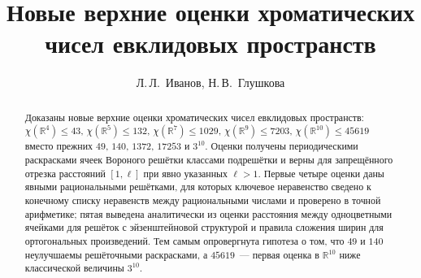 \documentclass{article}
\theoremstyle{plain}
\theoremstyle{remark}
\newcommand{\R}{\mathbb{R}}
\begin{document}


\title{Новые верхние оценки хроматических чисел евклидовых пространств}

\author{Л.\,Л.~Иванов\Addressmark[1]\Emailmark[1],
Н.\,В.~Глушкова\Addressmark[2]\Emailmark[2]}





\dateA{\ldots}





\maketitle

\begin{abstract}
Доказаны новые верхние оценки хроматических чисел евклидовых пространств:
$\chi(\R^4)\le43$, $\chi(\R^5)\le132$, $\chi(\R^7)\le1029$,
$\chi(\R^9)\le7203$, $\chi(\R^{10})\le45619$ вместо прежних $49$, $140$,
$1372$, $17253$ и $3^{10}$. Оценки получены периодическими раскрасками ячеек
Вороного решётки классами подрешётки и верны для запрещённого отрезка
расстояний $[1,\ell]$ при явно указанных $\ell>1$. Первые четыре оценки даны
явными рациональными решётками, для которых ключевое неравенство сведено к
конечному списку неравенств между рациональными числами и проверено в
точной арифметике; пятая выведена аналитически из оценки расстояния между
одноцветными ячейками для решёток с эйзенштейновой структурой и правила сложения ширин для
ортогональных произведений. Тем самым опровергнута гипотеза о том, что $49$ и $140$
неулучшаемы решёточными раскрасками, а $45619$~--- первая оценка в $\R^{10}$
ниже классической величины $3^{10}$.
\end{abstract}
\end{document}
